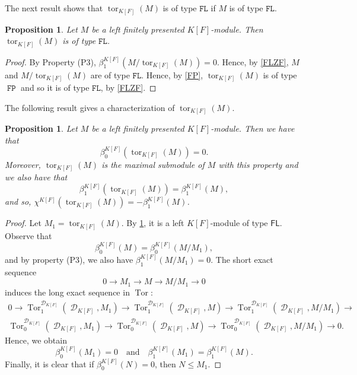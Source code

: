 \documentclass{amsart}
\newtheorem{pro}[lem]{Proposition}
\theoremstyle{definition}
\theoremstyle{remark}
\DeclareMathOperator{\D}{\mathcal D}
\DeclareMathOperator{\tor}{tor}
\newcommand{\FL}{\mathtt{FL}}
\DeclareMathOperator{\Tor}{Tor}
\DeclareMathOperator{\FP}{\mathtt{FP}}
\begin{document}
 The next result shows that $\tor_{K[F]}(M)$ is of type $\FL$  if $M$ is of type $\FL$.


\begin{pro}\label{torfp}
Let   $M$ be  a left finitely presented $K[F]$-module. Then  $\tor_{K[F]}(M)$ is of type $\FL$.  \end{pro}
\begin{proof}
By Property (P3), $\beta^{K[F]}_1(M/\tor_{K[F]}(M))=0$. Hence, by \cref{FLZF}, $M$ and $M/\tor_{K[F]}(M)$ are of type $\FL$. Hence, by \cref{FP}, $\tor_{K[F]}(M)$ is of type $\FP$ and so it is of type $\FL$, by \cref{FLZF}.
\end{proof}
 
  
The following result gives a characterization of $\tor_{K[F]}(M)$.
\begin{pro}\label{proptor}
Let   $M$ be a left finitely presented   ${K[F]}$-module. Then we have that $$\beta_0^{{K[F]}}(\tor_{{K[F]}}(M))=0.$$
 Moreover, $\tor_{{K[F]}}(M)$ is the maximal submodule of $M$ with this property and we also have that $$ \beta_1^{{K[F]}}(\tor_{{K[F]}}(M))=\beta_1^{{K[F]}}(M),$$ and so, $ \chi^{{K[F]}}(\tor_{{K[F]}}(M))=-\beta_1^{{K[F]}}(M)$. 
\end{pro}
\begin{proof}
Let $M_1 = \operatorname{tor}_{K[F]}(M)$. By \cref{torfp}, it is a left $K[F]$-module of type $\mathsf{FL}$. 
Observe that 
\[
\beta_0^{K[F]}(M) = \beta_0^{K[F]}(M/M_1),
\]
and by property  (P3), we also have $\beta_1^{K[F]}(M/M_1) = 0$. 
The short exact sequence
\[
0 \longrightarrow M_1 \longrightarrow M \longrightarrow M/M_1 \longrightarrow 0
\]
induces the long exact sequence in $\Tor$:
\begin{multline*}
0 \rightarrow \Tor_{1}^{\D_{K[F]}}(\D_{K[F]}, M_1) \rightarrow 
\Tor_{1}^{\D_{K[F]}}(\D_{K[F]}, M) \rightarrow 
\Tor_{1}^{\D_{K[F]}}(\D_{K[F]}, M/M_1) \rightarrow \\
\Tor_{0}^{\D_{K[F]}}(\D_{K[F]}, M_1) \rightarrow
\Tor_{0}^{\D_{K[F]}}(\D_{K[F]}, M) \rightarrow
\Tor_{0}^{\D_{K[F]}}(\D_{K[F]}, M/M_1) \rightarrow 0.
\end{multline*}
Hence, we obtain
\[
\beta_0^{K[F]}(M_1) = 0 \quad \text{and} \quad 
\beta_1^{K[F]}(M_1) = \beta_1^{K[F]}(M).
\]
Finally, it is clear that if $\beta_0^{K[F]}(N) = 0$, then $N \leq M_1$.

\end{proof}
\end{document}
